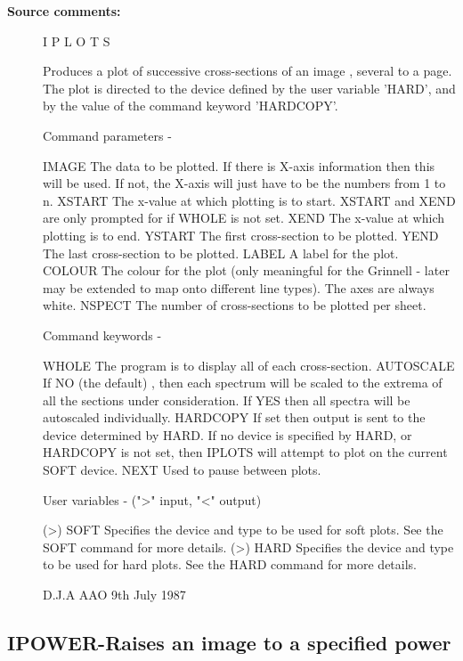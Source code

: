 \begin{description}
\begin{description}
\item [\textbf{Source comments:}]
\begin{terminalv}
 I P L O T S

 Produces a plot of successive cross-sections of an image ,
 several to a page. The plot is directed to the device
 defined by the user variable 'HARD', and by the value of
 the command keyword 'HARDCOPY'.

 Command parameters -

 IMAGE       The data to be plotted.  If there is X-axis information
             then this will be used.  If not, the X-axis will just
             have to be the numbers from 1 to n.
 XSTART      The x-value at which plotting is to start. XSTART and
             XEND are only prompted for if WHOLE is not set.
 XEND        The x-value at which plotting is to end.
 YSTART      The first cross-section to be plotted.
 YEND        The last cross-section to be plotted.
 LABEL       A label for the plot.
 COLOUR      The colour for the plot (only meaningful for the
             Grinnell - later may be extended to map onto
             different line types).  The axes are always white.
 NSPECT      The number of cross-sections to be plotted per sheet.

 Command keywords -

 WHOLE       The program is to display all of each cross-section.
 AUTOSCALE   If NO (the default) , then each spectrum will be scaled to
             the extrema of all the sections under consideration. If YES
             then all spectra will be autoscaled individually.
 HARDCOPY    If set then output is sent to the device determined
             by HARD. If no device is specified by HARD, or HARDCOPY is
             not set, then IPLOTS will attempt to plot on the current
             SOFT device.
 NEXT        Used to pause between plots.

 User variables -    (">" input, "<" output)

 (>) SOFT    Specifies the device and type to be used for soft
             plots.  See the SOFT command for more details.
 (>) HARD    Specifies the device and type to be used for hard
             plots.  See the HARD command for more details.


                                     D.J.A  AAO  9th July 1987
\end{terminalv}
\end{description}
\subsection{IPOWER-\label{IPOWER}Raises an image to a specified power}
\begin{description}


\end{description}
\end{description}
